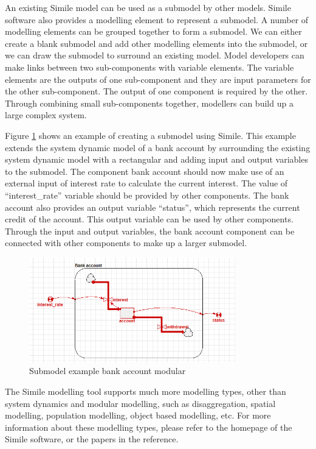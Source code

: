 \par
An existing Simile model can be used as a submodel by other models. Simile software also provides a modelling element to represent a submodel.  A number of modelling elements can be grouped together to form a submodel. We can either create a blank submodel and add other modelling elements into the submodel, or we can draw the submodel to surround an existing model. Model developers can make links between two sub-components with variable elements. The variable elements are the outputs of one sub-component and they are input parameters for the other sub-component. The output of one component is required by the other. Through combining small sub-components together, modellers can build up a large complex system.
\par
Figure \ref{fig:simile_example_submodel} shows an example of creating a submodel using Simile. This example extends the system dynamic model of a bank account by surrounding the existing system dynamic model with a rectangular and adding input and output variables to the submodel. The component bank account should now make use of an external input of interest rate to calculate the current interest. The value of ``interest\_rate'' variable should be provided by other components. The bank account also provides an output variable ``status'', which represents the current credit of the account. This output variable can be used by other components. Through the input and output variables, the bank account component can be connected with other components to make up a larger submodel.
\begin{figure}[h]
	\centering
	\includegraphics[width=0.8\textwidth]{pics/simile/simile_example_submodel.png}
	\caption{Submodel example bank account modular \label{fig:simile_example_submodel}}	
\end{figure}
\par
The Simile modelling tool supports much more modelling types, other than system dynamics and modular modelling, such as disaggregation, spatial modelling, population modelling, object based modelling, etc. For more information about these modelling types, please refer to the homepage of the Simile software, or the papers in the reference.
